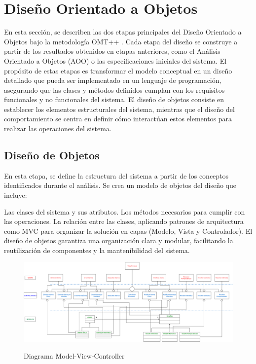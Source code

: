 \section{Diseño Orientado a Objetos}
En esta sección, se describen las dos etapas principales del Diseño Orientado a Objetos bajo la metodología OMT++ . Cada etapa del diseño se construye a partir de los resultados obtenidos en etapas anteriores, como el Análisis Orientado a Objetos (AOO) o las especificaciones iniciales del sistema. El propósito de estas etapas es transformar el modelo conceptual en un diseño detallado que pueda ser implementado en un lenguaje de programación, asegurando que las clases y métodos definidos cumplan con los requisitos funcionales y no funcionales del sistema.
El diseño de objetos consiste en establecer los elementos estructurales del sistema, mientras que el diseño del comportamiento se centra en definir cómo interactúan estos elementos para realizar las operaciones del sistema.

 \subsection{Diseño de Objetos}
 En esta etapa, se define la estructura del sistema a partir de los conceptos identificados durante el análisis. Se crea un modelo de objetos del diseño que incluye:

 Las clases del sistema y sus atributos.
 Los métodos necesarios para cumplir con las operaciones.
 La relación entre las clases, aplicando patrones de arquitectura como MVC para organizar la solución en capas (Modelo, Vista y Controlador).
 El diseño de objetos garantiza una organización clara y modular, facilitando la reutilización de componentes y la mantenibilidad del sistema.

 \begin{figure}[H]
	\centering
	\caption{Diagrama Model-View-Controller}
	\includegraphics[width=\textwidth]{./img/MVC.png}
        \vspace{10pt}
	\label{fig:Diagrama Model-View-Controller}
\end{figure}

